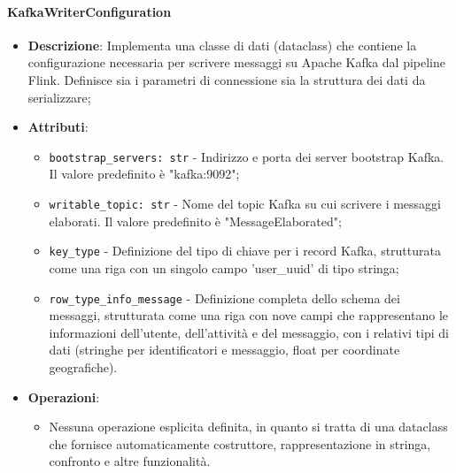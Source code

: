 \documentclass[10pt]{article}
\begin{document}
    \paragraph{KafkaWriterConfiguration}
    \begin{itemize} 
    \item \textbf{Descrizione}: Implementa una classe di dati (dataclass) che contiene la configurazione necessaria per scrivere messaggi su Apache Kafka dal pipeline Flink. Definisce sia i parametri di connessione sia la struttura dei dati da serializzare;
    \item \textbf{Attributi}:
    \begin{itemize}
        \item \texttt{bootstrap\_servers: str} - Indirizzo e porta dei server bootstrap Kafka. Il valore predefinito è "kafka:9092";
        \item \texttt{writable\_topic: str} - Nome del topic Kafka su cui scrivere i messaggi elaborati. Il valore predefinito è "MessageElaborated";
        \item \texttt{key\_type} - Definizione del tipo di chiave per i record Kafka, strutturata come una riga con un singolo campo 'user\_uuid' di tipo stringa;
        \item \texttt{row\_type\_info\_message} - Definizione completa dello schema dei messaggi, strutturata come una riga con nove campi che rappresentano le informazioni dell'utente, dell'attività e del messaggio, con i relativi tipi di dati (stringhe per identificatori e messaggio, float per coordinate geografiche).
    \end{itemize}
    
    \item \textbf{Operazioni}:
    \begin{itemize}
        \item Nessuna operazione esplicita definita, in quanto si tratta di una dataclass che fornisce automaticamente costruttore, rappresentazione in stringa, confronto e altre funzionalità.
    \end{itemize}
    \end{itemize}
\end{document}

